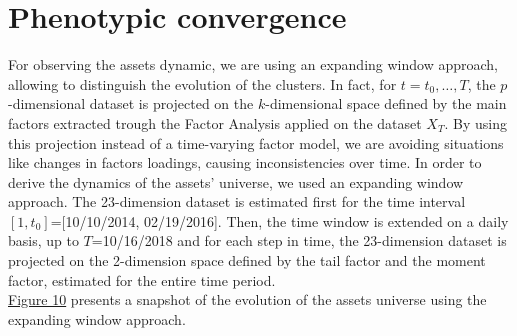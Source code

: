 \section{Phenotypic convergence}

For observing the assets dynamic, we are using an expanding window approach, allowing to distinguish the evolution of the clusters.
In fact, for $t=t_0,\ldots,T$, the $p$-dimensional dataset  is projected on the $k$-dimensional space defined by the main factors extracted trough the Factor Analysis applied on the dataset $X_T$. By using this projection instead of a time-varying factor model, we are avoiding situations like changes in factors loadings, causing inconsistencies over time.
In order to derive the dynamics of the assets’ universe, we used an expanding window approach. The 23-dimension dataset is estimated first for the time interval $[1,t_0]$=[10/10/2014, 02/19/2016]. Then, the time window is extended on a daily basis, up to $T$=10/16/2018 and for each step in time, the 23-dimension dataset is projected on the 2-dimension space defined by the tail factor and the moment factor, estimated for the entire time period.\\
\indent \hyperref[fig:figure_10]{Figure 10} presents a snapshot of the evolution of the assets universe using the expanding window approach.

